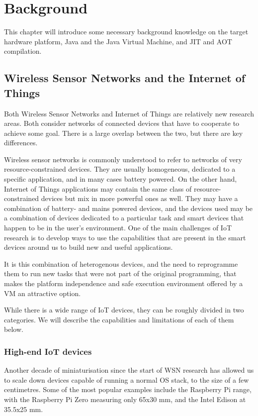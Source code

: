 \chapter{Background}
This chapter will introduce some necessary background knowledge on the target hardware platform, Java and the Java Virtual Machine, and JIT and AOT compilation.

\section{Wireless Sensor Networks and the Internet of Things}
Both Wireless Sensor Networks and Internet of Things are relatively new research areas. Both consider networks of connected devices that have to cooperate to achieve some goal. There is a large overlap between the two, but there are key differences.

Wireless sensor networks is commonly understood to refer to networks of very resource-constrained devices. They are usually homogeneous, dedicated to a specific application, and in many cases battery powered. On the other hand, Internet of Things applications may contain the same class of resource-constrained devices but mix in more powerful ones as well. They may have a combination of battery- and mains powered devices, and the devices used may be a combination of devices dedicated to a particular task and smart devices that happen to be in the user's environment. One of the main challenges of IoT research is to develop ways to use the capabilities that are present in the smart devices around us to build new and useful applications.

It is this combination of heterogenous devices, and the need to reprogramme them to run new tasks that were not part of the original programming, that makes the platform independence and safe execution environment offered by a VM an attractive option.

While there is a wide range of IoT devices, they can be roughly divided in two categories. We will describe the capabilities and limitations of each of them below. 


\subsection{High-end IoT devices}
Another decade of miniaturisation since the start of WSN research has allowed us to scale down devices capable of running a normal OS stack, to the size of a few centimetres. Some of the most popular examples include the Raspberry Pi range, with the Raspberry Pi Zero measuring only 65x30 mm, and the Intel Edison at 35.5x25 mm.

